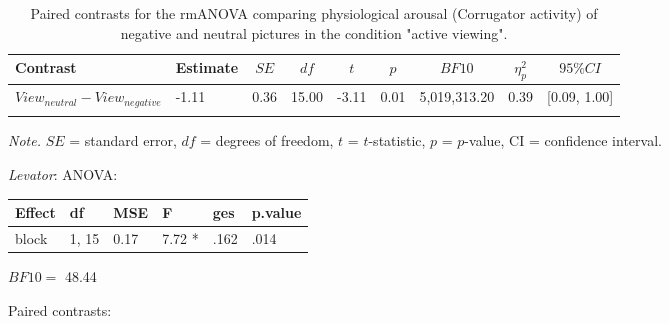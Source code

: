 \documentclass[
  english,
  man,floatsintext]{apa6}
\begin{document}
\begin{table}[H]

\begin{center}
\begin{threeparttable}

\caption{\label{tab:unnamed-chunk-5}Paired contrasts for the rmANOVA comparing physiological arousal (Corrugator activity) of negative and neutral pictures in the condition "active viewing".}

\begin{tabular}{lllllllll}
\toprule
Contrast & \multicolumn{1}{c}{Estimate} & \multicolumn{1}{c}{$SE$} & \multicolumn{1}{c}{$df$} & \multicolumn{1}{c}{$t$} & \multicolumn{1}{c}{$p$} & \multicolumn{1}{c}{$BF10$} & \multicolumn{1}{c}{$\eta_{p}^{2}$} & \multicolumn{1}{c}{$95\% CI$}\\
\midrule
$View_{neutral} - View_{negative}$ & -1.11 & 0.36 & 15.00 & -3.11 & 0.01 & 5,019,313.20 & 0.39 & {}[0.09, 1.00]\\
\bottomrule
\addlinespace
\end{tabular}

\begin{tablenotes}[para]
\normalsize{\textit{Note.} $SE$ = standard error, $df$ = degrees of freedom, $t$ = $t$-statistic, $p$ = $p$-value, CI = confidence interval.}
\end{tablenotes}

\end{threeparttable}
\end{center}

\end{table}

\emph{Levator}:
ANOVA:

\begin{tabular}{l|l|l|l|l|l}
\hline
Effect & df & MSE & F & ges & p.value\\
\hline
block & 1, 15 & 0.17 & 7.72 * & .162 & .014\\
\hline
\end{tabular}

\(BF10=\) 48.44

Paired contrasts:
\end{document}
